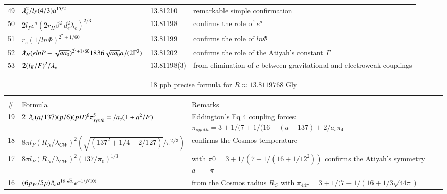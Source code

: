 \documentclass[a4paper,9pt]{article}
\begin{document}
\begin{appendix}
\begin{table}
\begin{tabular}{llll}
    49 & $ \lambdabar_{e}^2/l_P (4/3) a^{15/2}   $ & 13.81210 & remarkable simple confirmation  \\
    
    
    50 & $ 2l_P e^a (2r_H \beta^2 \ d_e^2 \lambda_e)^{2/3}   $ & 13.81198 & confirms the role of $e^a$  \\
    
    
    
    51 & $ r_e (1/ln\Phi)^{2^7 + 1/60}   $ & 13.81199 & confirms the role of $ln\Phi$  \\
    
    
    
    
    52 & $ \lambdabar_{H} (elnP-\sqrt{aa_0})^{2^7 + 1/60} 1836 \sqrt{aa_0} a/(2\Gamma^3)   $ & 13.81202& confirms the role of the Atiyah's constant $\Gamma$  \\
    
    
    
    
    
     53 & $ 2(l_K/F)^2/\lambdabar_{e}$ & 13.81198(3) & from elimination of $c$ between gravitational and electroweak couplings \\
   
  
    \bottomrule
  \end{tabular}
\end{table}


\begin{table}
\caption{18 ppb precise formula for $R \approx 13.8119768$ Gly}
\label{tab:8:table8}
  \hskip-2.0cm\begin{tabular}{llll}
    \toprule
    \multicolumn{3}{c}{}                   \\
    \cmidrule(r){1-3}
    \#     & Formula  & Remarks \\
    \midrule
 
 
  19 & 2 $\lambdabar_{e} (a/137) (p/6) (pH)^6\pi_{synth}^5= /a_s (1+a^2/F) $ & Eddington's Eq 4 coupling forces:  $\pi_{synth} = 3+1/(7 + 1/(16 -(a-137) +2/a_s\pi_4$  \\ 
        
 
  18 & $ 8\pi l_P (R_N/\lambda_{CW})^2 (\sqrt{(137^2 + 1/4 + 2/127)}/\pi^{2/3})   $ & confirms the Cosmos temperature   \\  
   
    17 & $ 8\pi l_P (R_N/\lambda_{CW})^2 (137/\pi_0)^{1/3}   $ & with $\pi0 = 3+1/(7+1/(16+1/12^2))$ confirms the Atiyah's symmetry $a--\pi$    \\
  
   16 & $(6p_W/5p)\lambdabar_{e} a^{16 \sqrt a_s} e^{-1/f(10)}$ & from the Cosmos radius $R_C$ with $\pi_{44\pi} = 3+1/(7 + 1/(16 + 1/3\sqrt{44\pi})$  \\
  

\end{tabular}
\end{table}
\end{appendix}
\end{document}
